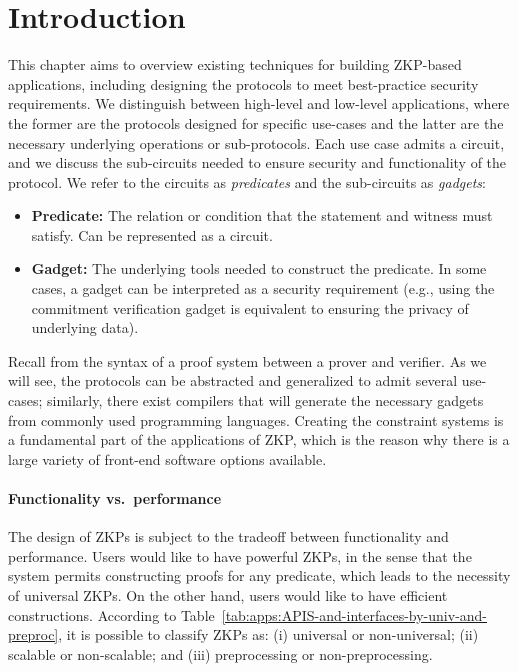 \section{Introduction}
\label{apps:intro}
 
This chapter aims to overview existing techniques for building ZKP-based applications, including designing the protocols to meet best-practice security requirements.
We distinguish between high-level and low-level applications, where the former are the protocols designed for specific use-cases and the latter are the necessary underlying operations or sub-protocols.
Each use case admits a circuit, and we discuss the sub-circuits needed to ensure security and functionality of the protocol.
We refer to the circuits as \emph{predicates} and the sub-circuits as \emph{gadgets}:

\begin{itemize}
    \item {\bfseries \hypertarget{def:predicate}{Predicate}:} 
    The relation or condition that the statement and witness must satisfy.
    Can be represented as a circuit.

    \item \textbf{\hypertarget{def:gadget}{Gadget}:} 
    The underlying tools needed to construct the predicate.  
    In some cases, a gadget can be interpreted as a security requirement (e.g., using the commitment verification gadget is equivalent to ensuring the privacy of underlying data).
\end{itemize}

Recall from  the syntax of a proof system between a prover and verifier.
As we will see, the protocols can be abstracted and generalized to admit several use-cases; 
similarly, there exist compilers that will generate the necessary gadgets from commonly used programming languages. 
Creating the constraint systems is a fundamental part of the applications of ZKP, which is the reason why there is a large variety of front-end software options available.


\paragraph{Functionality vs.\ performance}
The design of ZKPs is subject to the tradeoff between functionality and performance. 
Users would like to have powerful ZKPs, in the sense that the system permits constructing proofs for any predicate, which leads to the necessity of universal ZKPs. 
On the other hand, users would like to have efficient constructions. 
According to Table~\ref{tab:apps:APIS-and-interfaces-by-univ-and-preproc}, it is possible to classify ZKPs as:
(i) universal or non-universal;
(ii) scalable or non-scalable; and 
(iii) preprocessing or non-preprocessing. 

